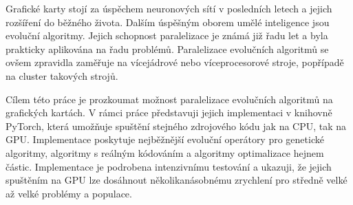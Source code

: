 \documentclass[12pt]{report}
\begin{document}
Grafické karty stojí za úspěchem neuronových sítí v posledních letech a jejich rozšíření do běžného života. Dalším úspěšným oborem umělé inteligence jsou evoluční algoritmy. Jejich schopnost paralelizace je známá již řadu let a byla prakticky aplikována na řadu problémů. Paralelizace evolučních algoritmů se ovšem zpravidla zaměřuje na vícejádrové nebo víceprocesorové stroje, popřípadě na cluster takových strojů.

Cílem této práce je prozkoumat možnost paralelizace evolučních algoritmů na grafic\-kých kartách. V rámci práce představuji jejich implementaci v knihovně PyTorch, která umožňuje spuštění stejného zdrojového kódu jak na CPU, tak na GPU. Implementace poskytuje nejběžnější evoluční operátory pro genetické algoritmy, algoritmy s reálným kódováním a algoritmy optimalizace hejnem částic. Implementace je podrobena inten\-zivnímu testování a ukazuji, že jejich spuštěním na GPU lze dosáhnout několika\-násobnému zrychlení pro středně velké až velké problémy a populace.
\end{document}
